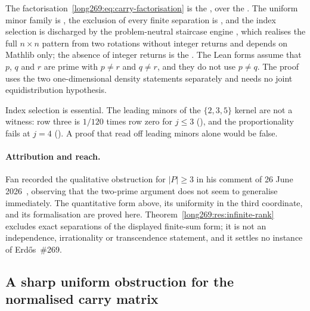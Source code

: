\noindent The factorisation~\eqref{long269:eq:carry-factorisation} is the
, over the
.  The uniform minor family is
,
the exclusion of every finite separation is
,
and the index selection is discharged by the problem-neutral staircase engine
,
which realises the full $n\times n$ pattern from two rotations without integer
returns and depends on Mathlib only; the absence of integer returns is the
.  The Lean forms assume that $p$,
$q$ and $r$ are prime with $p\ne r$ and $q\ne r$, and they do not use $p\ne q$.
The proof uses the two one-dimensional density statements separately and needs
no joint equidistribution hypothesis.

Index selection is essential.  The leading minors of the
$\{2,3,5\}$ kernel are not a witness: row three is $1/120$ times row zero for
$j\le3$
(),
and the proportionality fails at $j=4$
().
A proof that read off leading minors alone would be false.

\paragraph{Attribution and reach.}
Fan recorded the qualitative obstruction for $|P|\ge3$ in his comment of
26 June 2026~\cite{fan2026comment}, observing that the two-prime argument does
not seem to generalise immediately.  The quantitative form above, its
uniformity in the third coordinate, and its formalisation are proved here.
Theorem~\ref{long269:res:infinite-rank} excludes exact separations of the displayed
finite-sum form; it is not an independence, irrationality or transcendence
statement, and it settles no instance of Erd\H{o}s~\#269.

\subsection{A sharp uniform obstruction for the normalised carry matrix}

